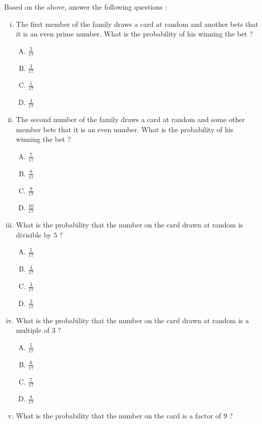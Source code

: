 \documentclass{article}
\begin{document}
\begin{enumerate}
    Based on the above, answer the following questions :
    \begin{enumerate}[(i)]
        \item The first member of the family draws a card at random and another  bets that it is an even prime number. What is the probability of his winning the bet ?
        \begin{enumerate}[(A)]
             \item $\frac{2}{17}$
             \item $\frac{3}{17}$
             \item $\frac{1}{17}$
             \item $\frac{4}{17}$
        \end{enumerate}
        \item The second number of the family draws a card at random and some other member bets that it is an even number. What is the probability of his winning the bet ?
        \begin{enumerate}[(A)]
             \item $\frac{7}{17}$
             \item $\frac{8}{17}$
             \item $\frac{9}{17}$
             \item $\frac{10}{17}$
        \end{enumerate}
        \item What is the probability that the number on the card drawn at random is divisible by $5$ ?
        \begin{enumerate}[(A)]
             \item $\frac{5}{17}$
             \item $\frac{4}{17}$
             \item $\frac{3}{17}$
             \item $\frac{2}{17}$
        \end{enumerate}
        \item What is the probability that the number on the card drawn at random is a multiple of $3$ ?
         \begin{enumerate}[(A)]
             \item $\frac{5}{17}$
             \item $\frac{6}{17}$
             \item $\frac{7}{17}$
             \item $\frac{8}{17}$
        \end{enumerate}
        \item What is the probability that the number on the card is a factor of $9$ ?

\end{enumerate}
\end{enumerate}
\end{document}
